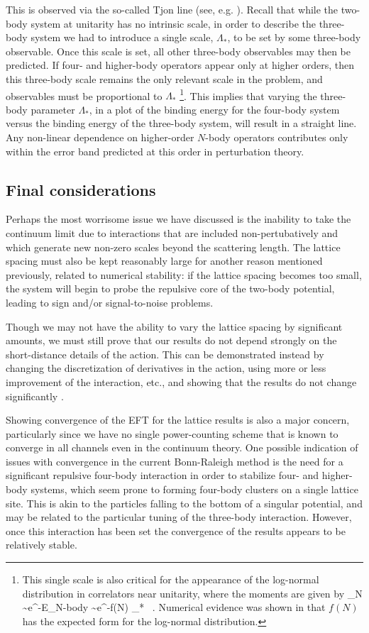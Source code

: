 This is observed via the so-called Tjon line (see, e.g. \cite{Hammer:2010kp}). Recall that while the two-body system at unitarity has no intrinsic scale, in order to describe the three-body system we had to introduce a single scale, $\Lambda_{*}$, to be set by some three-body observable. Once this scale is set, all other three-body observables may then be predicted. If four- and higher-body operators appear only at higher orders, then this three-body scale remains the only relevant scale in the problem, and observables must be proportional to $\Lambda_{*}$ \footnote{This single scale is also critical for the appearance of the log-normal distribution in correlators near unitarity, where the moments are given by
\beq
{}_N \sim e^{-E_{\mbox{\tiny N-body}}\tau} \sim e^{-f(N) \Lambda_{*} \tau} \ .
\eeq
Numerical evidence was shown in \cite{Nicholson:2012zp} that $f(N)$ has the expected form for the log-normal distribution.}. This implies that varying the three-body parameter $\Lambda_{*}$, in a plot of the binding energy for the four-body system versus the binding energy of the three-body system, will result in a straight line. Any non-linear dependence on higher-order $N$-body operators contributes only within the error band predicted at this order in perturbation theory.

\subsection{\label{conclusions}Final considerations}
Perhaps the most worrisome issue we have discussed is the inability to take the continuum limit due to interactions that are included non-pertubatively and which generate new non-zero scales beyond the scattering length. The lattice spacing must also be kept reasonably large for another reason mentioned previously, related to numerical stability: if the lattice spacing becomes too small, the system will begin to probe the repulsive core of the two-body potential, leading to sign and/or signal-to-noise problems. 

Though we may not have the ability to vary the lattice spacing by significant amounts, we must still prove that our results do not depend strongly on the short-distance details of the action. This can be demonstrated instead by changing the discretization of derivatives in the action, using more or less improvement of the interaction, etc., and showing that the results do not change significantly \cite{Lee:2008fa}. 

Showing convergence of the EFT for the lattice results is also a major concern, particularly since we have no single power-counting scheme that is known to converge in all channels even in the continuum theory. One possible indication of issues with convergence in the current Bonn-Raleigh method is the need for a significant repulsive four-body interaction in order to stabilize four- and higher-body systems, which seem prone to forming four-body clusters on a single lattice site. This is akin to the particles falling to the bottom of a singular potential, and may be related to the particular tuning of the three-body interaction. However, once this interaction has been set the convergence of the results appears to be relatively stable.

